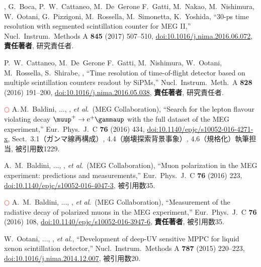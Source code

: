 \begin{enumerate}
  \me, G.~Boca, P.~W.~Cattaneo, M.~De~Gerone F.~Gatti, M.~Nakao, M.~Nishimura, W.~Ootani, G.~Pizzigoni, M.~Rossella, M.~Simonetta, K.~Yoshida, 
  ``30-ps time resolution with segmented scintillation counter for MEG II,''
  Nucl.\ Instrum.\ Methods A {\bf 845} (2017) 507--510,
  \href{https://doi.org/10.1016/j.nima.2016.06.072}{doi:10.1016/j.nima.2016.06.072},
  \textbf{責任著者}, 研究責任者.

  P.~W.~Cattaneo, M.~De~Gerone F.~Gatti, M.~Nishimura, W.~Ootani, M.~Rossella, S.~Shirabe, \me, 
  ``Time resolution of time-of-flight detector based on multiple scintillation counters readout by SiPMs,''
  Nucl.\ Instrum.\ Meth.\ A {\bf 828} (2016) 191--200,
  \href{http://dx.doi.org/10.1016/j.nima.2016.05.038}{doi:10.1016/j.nima.2016.05.038},
  \textbf{責任著者}, 研究責任者.

\textcolor{red}{$\bigcirc$} 
  A.\,M.~Baldini, ..., \me, {\it et al}.\ (MEG Collaboration),
  ``Search for the lepton flavour violating decay $\megc$ with the full dataset of the MEG experiment,''
  Eur.\ Phys.\ J.\ C {\bf 76} (2016) 434,
  \href{https://doi.org/10.1140/epjc/s10052-016-4271-x}{doi:10.1140/epjc/s10052-016-4271-x},
 Sect.\ 3.1（ガンマ線再構成）, 4.4（崩壊探索背景事象）, 4.6（規格化）執筆担当, 被引用数1229.

  A.~M.~Baldini, ..., \me, {\it et al}.\ (MEG Collaboration),
  ``Muon polarization in the MEG experiment: predictions and measurements,''
  Eur.\ Phys.\ J.\ C {\bf 76} (2016) 223,
  \href{http://dx.doi.org/10.1140/epjc/s10052-016-4047-3}{doi:10.1140/epjc/s10052-016-4047-3}, 被引用数35.

\textcolor{red}{$\bigcirc$}
  A.~M.~Baldini, ..., \me, {\it et al}.\ (MEG Collaboration),
  ``Measurement of the radiative decay of polarized muons in the MEG experiment,''
  Eur.\ Phys.\ J.\ C {\bf 76} (2016) 108,
  \href{https://doi.org/10.1140/epjc/s10052-016-3947-6}{doi:10.1140/epjc/s10052-016-3947-6},
\textbf{責任著者}, 被引用数35.

  W.~Ootani, ..., \me,  {\it et al}., %
  ``Development of deep-UV sensitive MPPC for liquid xenon scintillation detector,''
  Nucl.\ Instrum.\ Methods A {\bf 787} (2015) 220--223,
  \href{https://doi.org/10.1016/j.nima.2014.12.007}{doi:10.1016/j.nima.2014.12.007}, 被引用数20.


\end{enumerate}
